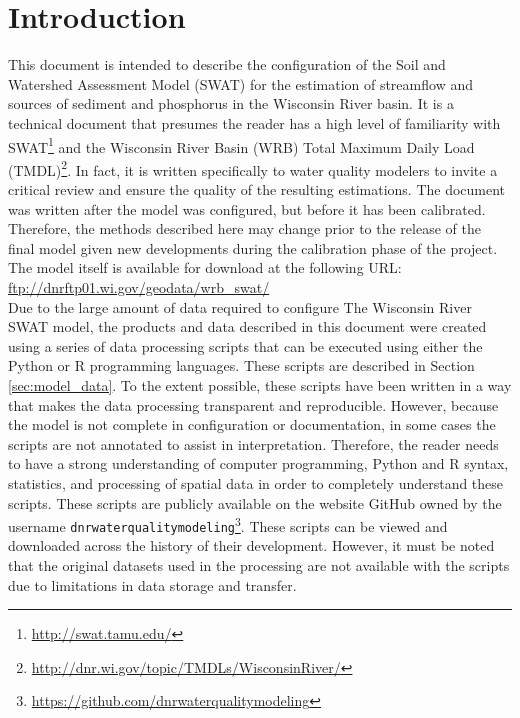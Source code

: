 \section{Introduction}
This document is intended to describe the configuration of the Soil and
Watershed Assessment Model (SWAT) \citep{arnold_swat_1994} for the estimation of streamflow and sources
of sediment and phosphorus in the Wisconsin River basin. It is a technical
document that presumes the reader has a high level of familiarity with SWAT\footnote{\url{http://swat.tamu.edu/}} and
the Wisconsin River Basin (WRB) Total Maximum Daily Load (TMDL)\footnote{\url{http://dnr.wi.gov/topic/TMDLs/WisconsinRiver/}}.
In fact, it is written specifically to water quality
modelers to invite a critical review and ensure the quality of the resulting
estimations. The document was written after the model was configured, but before
it has been calibrated. Therefore, the methods described here may change prior
to the release of the final model given new developments during the calibration
phase of the project. The model itself is available for download at the following URL: \\

\url{ftp://dnrftp01.wi.gov/geodata/wrb_swat/} \\

Due to the large amount of data required to configure The Wisconsin River SWAT model, the
products and data described in this document were created using a series of data 
processing scripts
that can be executed using either the Python or R programming languages. These scripts
are described in Section \ref{sec:model_data}. To the
extent possible, these scripts have been written in a way that makes
the data processing transparent and reproducible. However, because the model is
not complete in configuration or documentation, in some cases the scripts are not
annotated to assist in interpretation. Therefore, the reader needs to have a
strong understanding of computer programming, Python and R syntax, statistics,
and processing of spatial data in order to completely understand these scripts. These scripts are publicly available on the
website GitHub owned by the username
\texttt{dnrwaterqualitymodeling}\footnote{\url{https://github.com/dnrwaterqualitymodeling}}. 
These scripts can be viewed and downloaded
across the history of their development. However, it must be noted that the
original datasets used in the processing are not available with the scripts due
to limitations in data storage and transfer.

